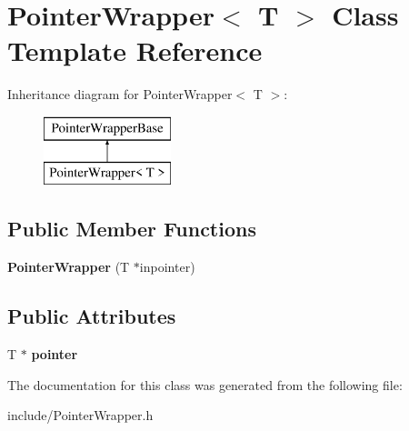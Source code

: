 \hypertarget{classPointerWrapper}{\section{Pointer\-Wrapper$<$ T $>$ Class Template Reference}
\label{classPointerWrapper}
}
Inheritance diagram for Pointer\-Wrapper$<$ T $>$\-:\begin{figure}[H]
\begin{center}
\leavevmode
\includegraphics[height=2.000000cm]{classPointerWrapper}
\end{center}
\end{figure}
\subsection*{Public Member Functions}
\begin{DoxyCompactItemize}
\item 
\hypertarget{classPointerWrapper_aa645eb1963f91c9bddf5fd6ff578751b}{{\bfseries Pointer\-Wrapper} (T $\ast$inpointer)}\label{classPointerWrapper_aa645eb1963f91c9bddf5fd6ff578751b}

\end{DoxyCompactItemize}
\subsection*{Public Attributes}
\begin{DoxyCompactItemize}
\item 
\hypertarget{classPointerWrapper_a4866798d33eed0a9aeaa3bcda53c4a0d}{T $\ast$ {\bfseries pointer}}\label{classPointerWrapper_a4866798d33eed0a9aeaa3bcda53c4a0d}

\end{DoxyCompactItemize}


The documentation for this class was generated from the following file\-:\begin{DoxyCompactItemize}
\item 
include/Pointer\-Wrapper.\-h\end{DoxyCompactItemize}
